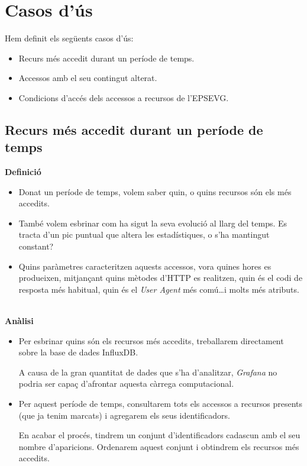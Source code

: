 \section{Casos d'ús}\label{sec:analysis-visualization-use-cases}

Hem definit els següents casos d'ús:

\begin{itemize}
    \item Recurs més accedit durant un període de temps.
    \item Accessos amb el seu contingut alterat.
    \item Condicions d'accés dels accessos a recursos de l'EPSEVG.
\end{itemize}

\subsection{Recurs més accedit durant un període de temps}\label{subsec:most-accessed-resource}

\textbf{Definició}

\begin{itemize}
    \item Donat un període de temps, volem saber quin, o quins recursos són els més accedits.
    \item També volem esbrinar com ha sigut la seva evolució al llarg del temps.
    Es tracta d'un pic puntual que altera les estadístiques, o s'ha mantingut constant?
    \item Quins paràmetres caracteritzen aquests accessos, vora quines hores es produeixen, mitjançant quins mètodes d'\gls{HTTP} es realitzen, quin és el codi de resposta més habitual, quin és el \textit{User Agent} més comú\dots  i molts més atributs.
\end{itemize}

\noindent \\
\textbf{Anàlisi}

\begin{itemize}
    \item Per esbrinar quins són els recursos més accedits, treballarem directament sobre la base de dades InfluxDB.

    A causa de la gran quantitat de dades que s'ha d'analitzar, \textit{Grafana} no podria ser capaç d'afrontar aquesta càrrega computacional.

    \item Per aquest període de temps, consultarem tots els accessos a recursos presents (que ja tenim marcats) i agregarem els seus identificadors.

    En acabar el procés, tindrem un conjunt d'identificadors cadascun amb el seu nombre d'aparicions.
    Ordenarem aquest conjunt i obtindrem els recursos més accedits.
\end{itemize}

